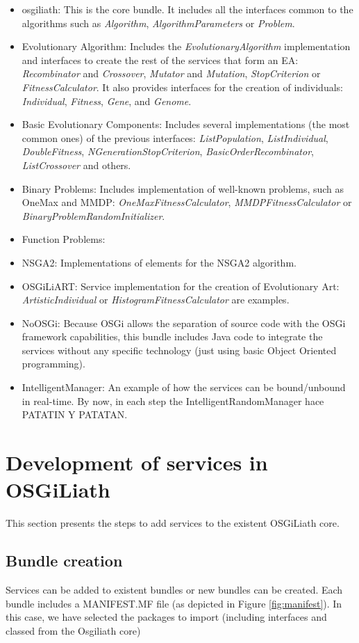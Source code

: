 \documentclass{sig-alternate}
\begin{document}
\begin{itemize}
\item osgiliath: This is the core bundle. It includes all the interfaces common to the algorithms such as {\em Algorithm}, {\em AlgorithmParameters} or {\em Problem}. 
\item Evolutionary Algorithm:  Includes the {\em EvolutionaryAlgorithm} implementation and interfaces to create the rest of the services that form an EA: {\em Recombinator} and {\em Crossover}, {\em Mutator} and {\em Mutation}, {\em StopCriterion} or {\em FitnessCalculator}. It also provides interfaces for the creation of individuals: {\em Individual}, {\em Fitness}, {\em Gene}, and {\em Genome}. 
\item Basic Evolutionary Components: Includes several implementations (the most common ones) of the previous interfaces: {\em ListPopulation}, {\em ListIndividual}, {\em DoubleFitness}, {\em NGenerationStopCriterion}, {\em BasicOrderRecombinator}, {\em ListCrossover} and others.
\item Binary Problems: Includes implementation of well-known problems, such as OneMax and MMDP: {\em OneMaxFitnessCalculator}, {\em MMDPFitnessCalculator} or {\em BinaryProblemRandomInitializer}.
\item Function Problems: 
\item NSGA2: Implementations of elements for the NSGA2 algorithm.
\item OSGiLiART: Service implementation for the creation of Evolutionary Art: {\em ArtisticIndividual} or {\em HistogramFitnessCalculator} are examples.
\item NoOSGi: Because OSGi allows the separation of source code with the OSGi framework capabilities, this bundle includes Java code to integrate the services without any specific technology (just using basic Object Oriented programming).
\item IntelligentManager: An example of how the services can be bound/unbound in real-time. By now, in each step the IntelligentRandomManager hace PATATIN Y PATATAN.
\end{itemize}

\section{Development of services in OSGiLiath}
\label{sec:development}
This section presents the steps to add services to the existent OSGiLiath core.

\subsection{Bundle creation}
Services can be added to existent bundles or new bundles can be created. Each bundle includes a MANIFEST.MF file (as depicted in Figure \ref{fig:manifest}). In this case, we have selected the packages to import (including interfaces and classed from the Osgiliath core)
\end{document}
